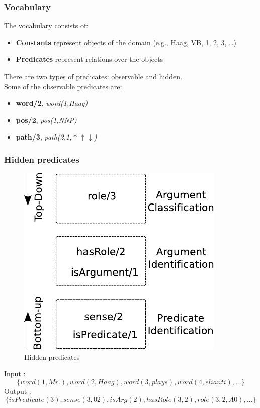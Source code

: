 \documentclass{beamer} \setbeamertemplate{navigation symbols}{}
\begin{document}
\begin{frame}
  \frametitle{Vocabulary}
  The vocabulary consists of:
  \begin{itemize}
  \item \textbf{Constants} represent objects of the domain (e.g., Haag,
    VB, 1, 2, 3, \ldots)
  \item \textbf{Predicates} represent relations over the objects
  \end{itemize}
  \bigskip There are two types of predicates: observable and
  hidden. \\Some of the observable predicates are:
  \begin{itemize}
  \item \textbf{word/2}, \emph{word(1,Haag)}
  \item \textbf{pos/2}, \emph{pos(1,NNP)}
  \item \textbf{path/3}, \emph{path(2,1,$\uparrow\uparrow\downarrow$)}
  \end{itemize}
    
\end{frame}

\begin{frame}
  \frametitle{Hidden predicates}
  \begin{figure}
    \begin{center}
      \includegraphics[scale=.70]{TaskArchitecture}
    \end{center}
    \caption{Hidden predicates}
    \label{fig:task}
  \end{figure}

  Input : \[\{word(1,Mr.),word(2,Haag), word(3,plays),
  word(4,elianti), \ldots \}\] Output : \[\{isPredicate(3),
  sense(3,02), isArg(2), hasRole(3,2), role(3,2,A0), \ldots \}\]

\end{frame}
\end{document}

